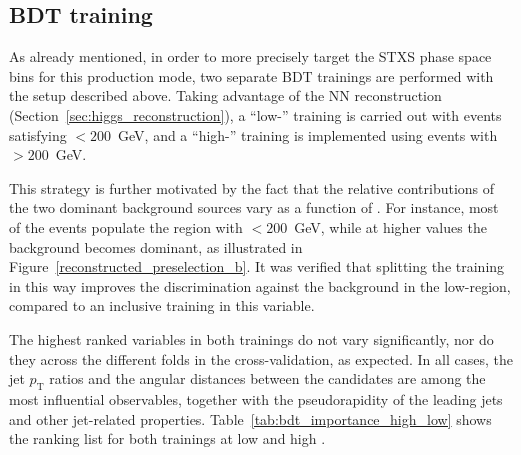 \subsection{BDT training}

As already mentioned, in order to more precisely target the STXS phase space bins for this \ttH production mode, two separate BDT trainings are performed with the setup described above. Taking advantage of the NN \pth reconstruction (Section~\ref{sec:higgs_reconstruction}), a ``low-\pth'' training is carried out with events satisfying \pth$<200$~GeV, and a ``high-\pth'' training is implemented using events with \pth$>200$~GeV.  

This strategy is further motivated by the fact that the relative contributions of the two dominant background sources vary as a function of \pth. For instance, most of the \ttbar events populate the region with \pth$<200$~GeV, while at higher values the \ztautau background becomes dominant, as illustrated in Figure~\ref{reconstructed_preselection_b}. It was verified that splitting the training in this way improves the discrimination against the \ttbar background in the low-\pth region, compared to an inclusive training in this variable.

The highest ranked variables in both trainings do not vary significantly, nor do they across the different folds in the cross-validation, as expected. In all cases, the jet $p_{\text{T}}$ ratios and the angular distances between the \tauhadvis candidates are among the most influential observables, together with the pseudorapidity of the leading jets and other jet-related properties. Table~\ref{tab:bdt_importance_high_low} shows the ranking list for both trainings at low and high \pth.

